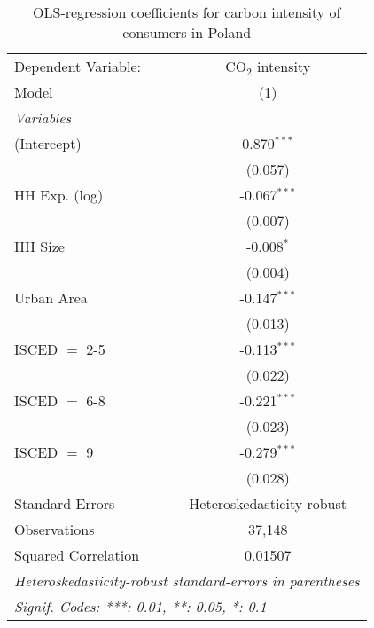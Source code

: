 
\begin{table}[htbp!]
   \centering
   \small
   \begin{adjustbox}{width = 1\textwidth, max height = 0.95\textheight, center}
      \begin{threeparttable}[b]
         \caption{\label{tab:OLS_1_POL} OLS-regression coefficients for carbon intensity of consumers in Poland}
         \begin{tabular}{lc}
            \tabularnewline \midrule \midrule
            Dependent Variable: & CO$_{2}$ intensity\\  
            Model               & (1)\\  
            \midrule
            \emph{Variables}\\
            (Intercept)         & 0.870$^{***}$\\   
                                & (0.057)\\   
            HH Exp. (log)       & -0.067$^{***}$\\   
                                & (0.007)\\   
            HH Size             & -0.008$^{*}$\\   
                                & (0.004)\\   
            Urban Area          & -0.147$^{***}$\\   
                                & (0.013)\\   
            ISCED $=$ 2-5       & -0.113$^{***}$\\   
                                & (0.022)\\   
            ISCED $=$ 6-8       & -0.221$^{***}$\\   
                                & (0.023)\\   
            ISCED $=$ 9         & -0.279$^{***}$\\   
                                & (0.028)\\   
            \midrule 
            Standard-Errors     & Heteroskedasticity-robust \\   
            Observations        & 37,148\\  
            Squared Correlation & 0.01507\\  
            \midrule \midrule
            \multicolumn{2}{l}{\emph{Heteroskedasticity-robust standard-errors in parentheses}}\\
            \multicolumn{2}{l}{\emph{Signif. Codes: ***: 0.01, **: 0.05, *: 0.1}}\\
         \end{tabular}
         

\end{threeparttable}
\end{adjustbox}
\end{table}
